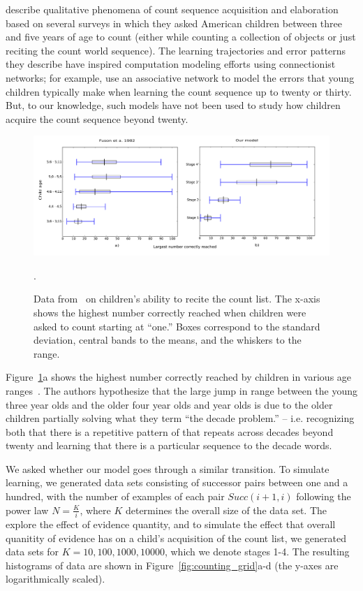 \documentclass[10pt,letterpaper]{article}
\begin{document}
\citet{FusRicBriar1982} describe qualitative phenomena of
count sequence acquisition and elaboration based on several surveys in
which they asked American children between three and five years of age
to count (either while counting a collection of objects or just
reciting the count world sequence). The learning trajectories and
error patterns they describe have inspired computation modeling
efforts using connectionist networks; for example,
\citet{ma1989modeling} use an associative network to model the errors
that young children typically make when learning the count sequence up
to twenty or thirty. But, to our knowledge, such models have not been
used to study how children acquire the count sequence beyond twenty.


\begin{figure}[t]
\includegraphics[width=0.9\linewidth]{figures/modelboxplot}
\caption{Data from~\citet{FusRicBriar1982} on children's ability to
  recite the count list. The x-axis shows the highest number correctly
  reached when children were asked to count starting at ``one.'' Boxes
  correspond to the standard deviation, central bands to the means,
  and the whiskers to the range.
\label{fig:fuson_model_comparison}}. 
\end{figure}

Figure~\ref{fig:fuson_model_comparison}a shows the highest number
correctly reached by children in various age
ranges~\cite{FusRicBriar1982}. The authors hypothesize that the large
jump in range between the young three year olds and the older four
year olds and year olds is due to the older children partially solving
what they term ``the decade problem.'' -- i.e. recognizing both that
there is a repetitive pattern of that repeats across decades beyond
twenty and learning that there is a particular sequence to the decade
words.

We asked whether our model goes through a similar transition. To
simulate learning, we generated data sets consisting of successor
pairs between one and a hundred, with the number of examples of each
pair $Succ(i+1, i)$ following the power law $N=\frac{K}{i}$, where $K$
determines the overall size of the data set. The explore the effect of
evidence quantity, and to simulate the effect that overall quanitity
of evidence has on a child's acquisition of the count list, we
generated data sets for $K=10, 100, 1000, 10000$, which we denote
stages 1-4. The resulting histograms of data are shown in
Figure~\ref{fig:counting_grid}a-d (the y-axes are logarithmically
scaled).
\end{document}
